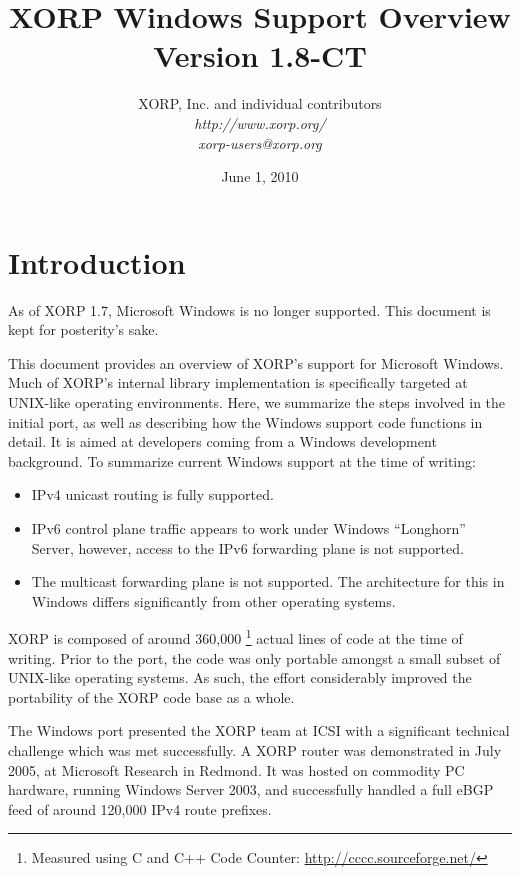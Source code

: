 \documentclass[11pt]{article}
\begin{document}
\title{XORP Windows Support Overview \\
\vspace{1ex}
Version 1.8-CT}
\author{ XORP, Inc. and individual contributors		\\
         {\it http://www.xorp.org/}			\\
	 {\it xorp-users@xorp.org}
}
\date{June 1, 2010}

\maketitle


\section{Introduction}

As of XORP 1.7, Microsoft Windows is no longer supported.  This
document is kept for posterity's sake.

This document provides an overview of XORP's support for Microsoft Windows.
Much of XORP's internal library implementation is specifically targeted
at UNIX-like operating environments. Here, we summarize the steps involved
in the initial port, as well as describing how the Windows support code
functions in detail. It is aimed at developers coming from a Windows
development background.
To summarize current Windows support at the time of writing:
\begin{itemize}
 \item IPv4 unicast routing is fully supported.
 \item IPv6 control plane traffic appears to work under Windows
``Longhorn'' Server, however, access to the IPv6 forwarding plane
is not supported.
 \item The multicast forwarding plane is not supported. The architecture
for this in Windows differs significantly from other operating systems.
\end{itemize}

XORP is composed of around 360,000
\footnote{Measured using C and C++ Code Counter: \url{http://cccc.sourceforge.net/}}
actual lines of code at the time of writing.
Prior to the port, the code was only portable amongst
a small subset of UNIX-like operating systems. As such, the effort
considerably improved the portability of the XORP code base as a whole.

The Windows port presented the XORP team at ICSI with a significant technical
challenge which was met successfully.
A XORP router  was
demonstrated in July 2005, at Microsoft Research in Redmond.
It was hosted on commodity PC hardware, running Windows Server 2003,
and successfully handled a full eBGP feed of around 120,000 IPv4 route prefixes.
\end{document}
